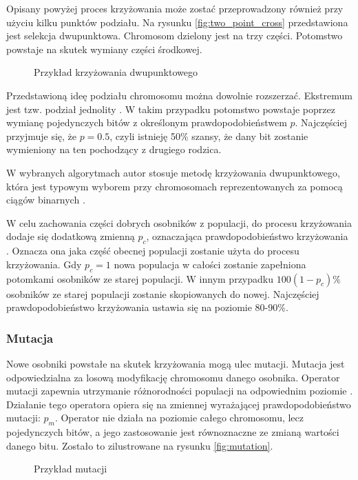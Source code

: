 \documentclass[twoside]{iisthesis}
\begin{document}
Opisany powyżej proces krzyżowania może zostać przeprowadzony również przy użyciu kilku punktów podziału. Na rysunku \eqref{fig:two_point_cross} przedstawiona jest selekcja dwupunktowa. Chromosom dzielony jest na trzy części. Potomstwo powstaje na skutek wymiany części środkowej.
\begin{figure}[!htb]
	\centering
	\caption{Przykład krzyżowania dwupunktowego}
	\label{fig:two_point_cross}
\end{figure}

Przedstawioną ideę podziału chromosomu można dowolnie rozszerzać. Ekstremum jest tzw. podział jednolity \cite{book}. W takim przypadku potomstwo powstaje poprzez wymianę pojedynczych bitów z określonym prawdopodobieństwem $p$. Najczęściej przyjmuje się, że $p = 0.5$, czyli istnieję 50\% szansy, że dany bit zostanie wymieniony na ten pochodzący z drugiego rodzica.

W wybranych algorytmach autor stosuje metodę krzyżowania dwupunktowego, która jest typowym wyborem przy chromosomach reprezentowanych za pomocą ciągów binarnych \cite{sensors}.

W celu zachowania części dobrych osobników z populacji, do procesu krzyżowania dodaje się dodatkową zmienną $p_{c}$, oznaczająca prawdopodobieństwo krzyżowania \cite{ga_book}. Oznacza ona jaka część obecnej populacji zostanie użyta do procesu krzyżowania. Gdy $p_{c} = 1$ nowa populacja w całości zostanie zapełniona potomkami osobników ze starej populacji. W innym przypadku $100(1 - p_{c})\%$ osobników ze starej populacji zostanie skopiowanych do nowej. Najczęściej prawdopodobieństwo krzyżowania ustawia się na poziomie 80-90\%.

\subsubsection{Mutacja}
Nowe osobniki powstałe na skutek krzyżowania mogą ulec mutacji. Mutacja jest odpowiedzialna za losową modyfikację chromosomu danego osobnika. Operator mutacji zapewnia utrzymanie różnorodności populacji na odpowiednim poziomie \cite{ga_book}. Działanie tego operatora opiera się na zmiennej wyrażającej prawdopodobieństwo mutacji: $p_{m}$. Operator nie działa na poziomie całego chromosomu, lecz pojedynczych bitów, a jego zastosowanie jest równoznaczne ze zmianą wartości danego bitu. Zostało to zilustrowane na rysunku \eqref{fig:mutation}.
\begin{figure}[!htb]
	\centering
	\caption{Przykład mutacji}
	\label{fig:mutation}
\end{figure}
\end{document}
